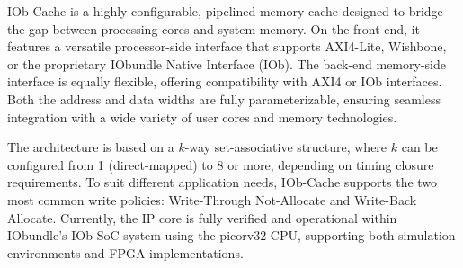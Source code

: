 %

IOb-Cache is a highly configurable, pipelined memory cache designed to bridge
the gap between processing cores and system memory. On the front-end, it
features a versatile processor-side interface that supports AXI4-Lite, Wishbone,
or the proprietary IObundle Native Interface (IOb). The back-end memory-side
interface is equally flexible, offering compatibility with AXI4 or IOb
interfaces. Both the address and data widths are fully parameterizable, ensuring
seamless integration with a wide variety of user cores and memory technologies.

The architecture is based on a $k$-way set-associative structure, where $k$ can
be configured from 1 (direct-mapped) to 8 or more, depending on timing closure
requirements. To suit different application needs, IOb-Cache supports the two
most common write policies: Write-Through Not-Allocate and Write-Back
Allocate. Currently, the IP core is fully verified and operational within
IObundle's IOb-SoC system using the picorv32 CPU, supporting both simulation
environments and FPGA implementations.


